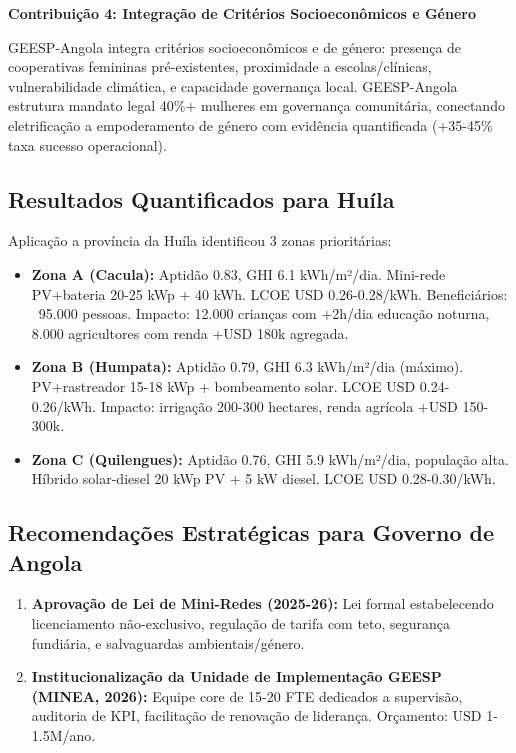 \documentclass[12pt, a4paper]{article}
\begin{document}
{{{{{{{{{{{{\textbf{Contribuição 4: Integração de Critérios Socioeconômicos e Género}

GEESP-Angola integra critérios socioeconômicos e de género: presença de cooperativas femininas pré-existentes, proximidade a escolas/clínicas, vulnerabilidade climática, e capacidade governança local. GEESP-Angola estrutura mandato legal 40\%+ mulheres em governança comunitária, conectando eletrificação a empoderamento de género com evidência quantificada (+35-45\% taxa sucesso operacional).

\subsection{Resultados Quantificados para Huíla}

Aplicação a província da Huíla identificou 3 zonas prioritárias:

\begin{itemize}
\item \textbf{Zona A (Cacula):} Aptidão 0.83, GHI 6.1 kWh/m²/dia. Mini-rede PV+bateria 20-25 kWp + 40 kWh. LCOE USD 0.26-0.28/kWh. Beneficiários: ~95.000 pessoas. Impacto: 12.000 crianças com +2h/dia educação noturna, 8.000 agricultores com renda +USD 180k agregada.

\item \textbf{Zona B (Humpata):} Aptidão 0.79, GHI 6.3 kWh/m²/dia (máximo). PV+rastreador 15-18 kWp + bombeamento solar. LCOE USD 0.24-0.26/kWh. Impacto: irrigação 200-300 hectares, renda agrícola +USD 150-300k.

\item \textbf{Zona C (Quilengues):} Aptidão 0.76, GHI 5.9 kWh/m²/dia, população alta. Híbrido solar-diesel 20 kWp PV + 5 kW diesel. LCOE USD 0.28-0.30/kWh.
\end{itemize}

\subsection{Recomendações Estratégicas para Governo de Angola}

\begin{enumerate}
\item \textbf{Aprovação de Lei de Mini-Redes (2025-26):} Lei formal estabelecendo licenciamento não-exclusivo, regulação de tarifa com teto, segurança fundiária, e salvaguardas ambientais/género.

\item \textbf{Institucionalização da Unidade de Implementação GEESP (MINEA, 2026):} Equipe core de 15-20 FTE dedicados a supervisão, auditoria de KPI, facilitação de renovação de liderança. Orçamento: USD 1-1.5M/ano.


\end{enumerate}}}}}}}}}}}}}
\end{document}

